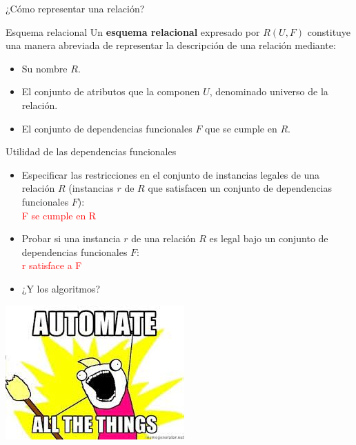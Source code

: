 \begin{frame}{¿C\'omo representar una relaci\'on?}
    \begin{block}{Esquema relacional}
        Un \textbf{esquema relacional} expresado por $R(U,F)$
        constituye una manera abreviada de representar
        la descripci\'on de una relaci\'on mediante: 
        \begin{itemize}
            \item Su nombre $R$.
            \item El conjunto de atributos que la componen $U$, denominado universo de la relaci\'on.
            \item El conjunto de dependencias funcionales $F$ que se cumple en $R$.
        \end{itemize}
    \end{block}
    
\end{frame}

\begin{frame}{Utilidad de las dependencias funcionales}
    \begin{itemize}
        \item<1-> Especificar las restricciones en el conjunto de instancias
        legales de una relaci\'on $R$ 
        (instancias $r$ de $R$ que satisfacen un conjunto de dependencias funcionales $F$):\\ 
        \centering \textcolor{red}{F se cumple en R}\vspace{2mm}
        \item<2-> Probar si una instancia $r$ de una relaci\'on $R$ es legal bajo un conjunto de
        dependencias funcionales $F$:\\
        \centering \textcolor{red}{r satisface a F} \vspace{2mm}
        \item<3-> ¿Y los algoritmos?
    \end{itemize}

\end{frame}

{
{
    \includegraphics[width=\paperwidth,height=\paperheight]{img/automate.jpg}
}
\begin{frame}
\end{frame}
}





